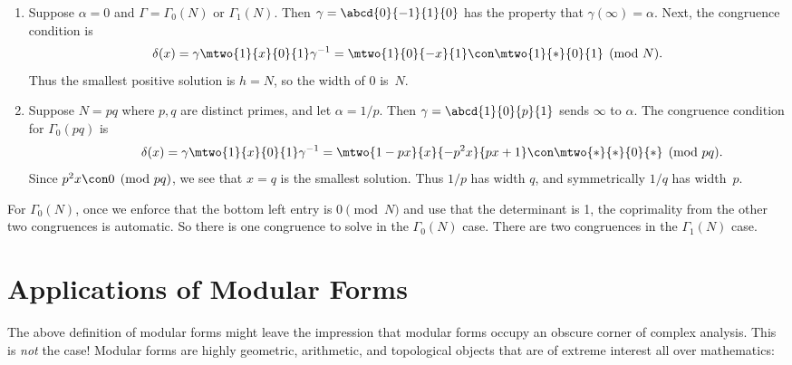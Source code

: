 \begin{example}
\begin{enumerate}
\item
Suppose $\alpha=0$ and $\Gamma=\Gamma_0(N)$ or $\Gamma_1(N)$.
Then $\gamma=\abcd{0}{-1}{1}{\hfill 0}$ has the property that $\gamma(\infty)=\alpha$.
Next, the congruence condition is 
$$\delta(x) = \gamma \mtwo{1}{x}{0}{1} \gamma^{-1} = \mtwo{1}{0}{-x}{1} 
  \con \mtwo{1}{*}{0}{1}\pmod{N}.
$$
Thus the smallest positive solution is $h=N$, so the width of $0$
is~$N$.

\item Suppose $N=pq$ where $p,q$ are distinct primes, and let $\alpha=1/p$.
Then $\gamma=\abcd{1}{0}{p}{1}$ sends $\infty$ to $\alpha$.
The congruence condition for $\Gamma_0(pq)$ is 
$$
\qquad \qquad\delta(x) = \gamma \mtwo{1}{x}{0}{1} \gamma^{-1} = \mtwo{1-px}{x}{-p^2 x}{px+1}
  \con \mtwo{*}{*}{0}{*}\pmod{pq}.
$$
Since $p^2x \con 0\pmod{pq}$, we see that $x=q$ is the smallest solution.
Thus $1/p$ has width $q$, and symmetrically $1/q$ has width~$p$.
\end{enumerate}
\end{example}
\begin{remark}
For $\Gamma_0(N)$, once we enforce that the bottom 
left entry is $0\pmod{N}$ and use that the determinant is 1, the 
coprimality from the other two congruences is automatic.
So there is one congruence to solve in the $\Gamma_0(N)$ case.
There are two congruences in the $\Gamma_1(N)$ case. 
\end{remark}

\section{Applications of Modular Forms}\label{sec:apps}
The above definition of modular forms might leave the impression that
modular forms occupy an obscure corner of complex analysis.  This is
{\em not} the case! Modular forms are highly geometric,  %
arithmetic, and topological objects that are of extreme interest all
over mathematics:

